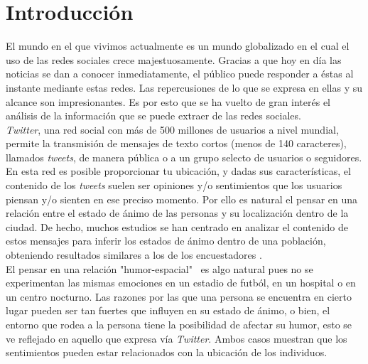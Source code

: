 \documentclass{article}
\begin{document}
	\section{Introducción}
		El mundo en el que vivimos actualmente es un mundo globalizado en el cual el uso de las redes sociales crece majestuosamente. Gracias a que hoy en día las noticias se dan a conocer inmediatamente, el público puede responder a éstas al instante mediante estas redes. Las repercusiones de lo que se expresa en ellas y su alcance son impresionantes. Es por esto que se ha vuelto de gran interés el análisis de la información que se puede extraer de las redes sociales.\\[.3cm]
%
\emph{Twitter}, una red social con más de 500 millones de usuarios a nivel mundial, permite la transmisión de mensajes de texto cortos (menos de 140 caracteres), llamados \emph{tweets}, de manera pública o a un grupo selecto de usuarios o seguidores. En esta red es posible proporcionar tu ubicación, y dadas sus características, el contenido de los \emph{tweets} suelen ser opiniones y/o sentimientos que los usuarios piensan y/o sienten en ese preciso momento. Por ello es natural el pensar en una relación entre el estado de ánimo de las personas y su localización dentro de la ciudad. De hecho, muchos estudios se han centrado en analizar el contenido de estos mensajes para inferir los estados de ánimo dentro de una población, obteniendo resultados similares a los de los encuestadores \cite{Oconnor, Bollen}.\\[.3cm]
%
El pensar en una relación "humor-espacial" \ es algo natural pues no se experimentan las mismas emociones en un estadio de futból, en un hospital o en un centro nocturno. Las razones por las que una persona se encuentra en cierto lugar pueden ser tan fuertes que influyen en su estado de ánimo, o bien, el entorno que rodea a la persona tiene la posibilidad de afectar su humor, esto se ve reflejado en aquello que expresa vía \emph{Twitter}. Ambos casos muestran que los sentimientos pueden estar relacionados con la ubicación de los individuos.\\[.3cm]
%
		
\newpage
\end{document}
